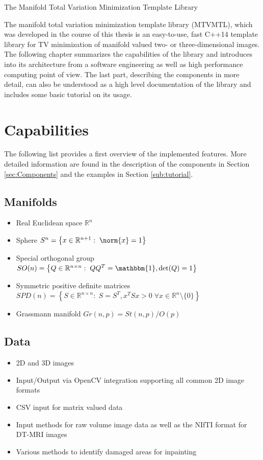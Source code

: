\begin{chapter}{The Manifold Total Variation Minimization Template Library}
\label{ch:library}

The manifold total variation minimization template library (MTVMTL), which was developed in the course of this thesis is an easy-to-use, fast C++14 template library for TV minimization of manifold valued two- or three-dimensional images. \\

The following chapter summarizes the capabilities of the library
and introduces into its architecture from a software engineering as well as high performance computing point of view. The last part,
describing the components in more detail, can also be understood as a high level documentation of the library and includes some basic tutorial on its usage.


\section{Capabilities} %
\label{sec:Capabilities}
The following list provides a first overview of the implemented features. More detailed
information are found in the description of the components in Section \ref{sec:Components}
and the examples in Section \ref{sub:tutorial}.
\subsection*{Manifolds} %
\label{sub:supportedManifolds}
\begin{itemize}
    \item Real Euclidean space $\mathbb{R}^n$
    \item Sphere $S^n=\left\lbrace x\in\mathbb{R}^{n+1}:\; \norm{x}=1\right\rbrace$
    \item Special orthogonal group $SO(n)=\left\lbrace Q\in\mathbb{R}^{n\times n}:\; QQ^T=\mathbbm{1}, \operatorname{det}(Q)=1 \right\rbrace$
    \item Symmetric positive definite matrices $SPD(n)=\left\lbrace S\in\mathbb{R}^{n\times n}:\; S=S^T, x^TSx>0\; \forall x\in\mathbb{R}^n\setminus\lbrace 0\rbrace \right\rbrace$
    \item Grassmann manifold $Gr(n,p) = St(n,p) / O(p)$
\end{itemize}

\subsection*{Data} %
\label{sub:Data}
\begin{itemize}
	\item 2D and 3D images
	\item Input/Output via OpenCV integration supporting all common 2D image formats
	\item CSV input for matrix valued data
	\item Input methods for raw volume image data as well as the NIfTI \cite{nifti} format for DT-MRI images
	\item Various methods to identify damaged areas for inpainting
\end{itemize}


\end{chapter}
